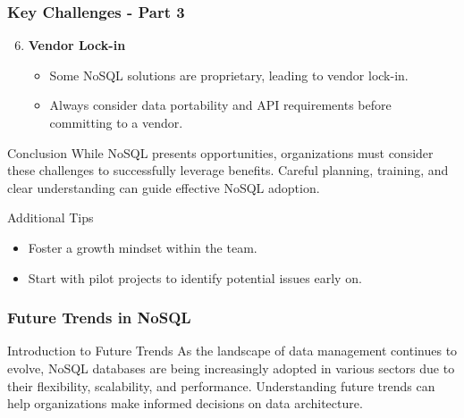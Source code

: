 \documentclass[aspectratio=169]{beamer}
\begin{document}
\begin{frame}[fragile]
    \frametitle{Key Challenges - Part 3}
    \begin{enumerate}
        \setcounter{enumi}{5} %
        \item \textbf{Vendor Lock-in}
        \begin{itemize}
            \item Some NoSQL solutions are proprietary, leading to vendor lock-in.
            \item Always consider data portability and API requirements before committing to a vendor.
        \end{itemize}
    \end{enumerate}
    
    \begin{block}{Conclusion}
        While NoSQL presents opportunities, organizations must consider these challenges to successfully leverage benefits. 
        Careful planning, training, and clear understanding can guide effective NoSQL adoption.
    \end{block}
    
    \begin{block}{Additional Tips}
        \begin{itemize}
            \item Foster a growth mindset within the team.
            \item Start with pilot projects to identify potential issues early on.
        \end{itemize}
    \end{block}
\end{frame}

\begin{frame}[fragile]
    \frametitle{Future Trends in NoSQL}
    \begin{block}{Introduction to Future Trends}
        As the landscape of data management continues to evolve, NoSQL databases are being increasingly adopted in various sectors due to their flexibility, scalability, and performance. Understanding future trends can help organizations make informed decisions on data architecture.
    \end{block}
\end{frame}
\end{document}
